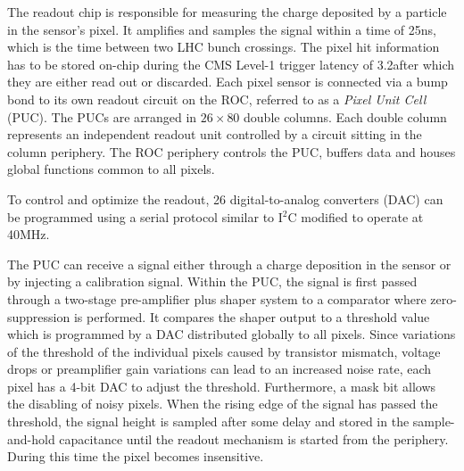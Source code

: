 The readout chip is responsible for measuring the charge deposited by a particle in the sensor's pixel.
It amplifies and samples the signal within a time of 25\unit{ns}, which is the time between two LHC bunch crossings.
The pixel hit information has to be stored on-chip during the CMS Level-1 trigger latency of 3.2\mus after which they are either read out or discarded.
Each pixel sensor is connected via a bump bond to its own readout circuit on the ROC, referred to as a \textit{Pixel Unit Cell} (PUC). 
The PUCs are arranged in $26\times80$ double columns. Each double column represents an independent readout unit controlled by a circuit sitting in the column periphery.
The ROC periphery controls the PUC, buffers data and houses global functions common to all pixels.

To control and optimize the readout, 26 digital-to-analog converters (DAC) can be programmed using a serial protocol similar to I$^2$C modified to operate at 40\unit{MHz}.

The PUC can receive a signal either through a charge deposition in the sensor or by injecting a calibration signal.
Within the PUC, the signal is first passed through a two-stage pre-amplifier plus shaper system to a comparator where zero-suppression is performed.
It compares the shaper output to a threshold value which is programmed by a DAC distributed globally to all pixels.
Since variations of the threshold of the individual pixels caused by transistor mismatch, voltage drops or preamplifier gain variations can lead to an increased noise rate,
each pixel has a 4-bit DAC to adjust the threshold. Furthermore, a mask bit allows the disabling of noisy pixels.
When the rising edge of the signal has passed the threshold, the signal height is sampled after some delay and stored in the sample-and-hold capacitance until the readout mechanism is started from the periphery. During this time the pixel becomes insensitive.

